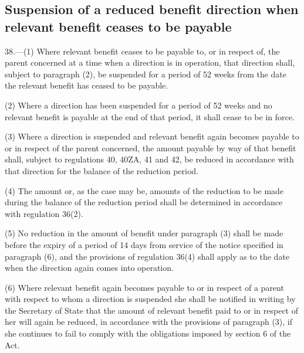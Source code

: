 \documentclass[a4paper,12pt]{article}
\begin{document}

\subsection[38. Suspension of a reduced benefit direction when relevant benefit ceases to be payable]{Suspension of a reduced benefit direction when relevant benefit ceases to be payable}

38.—(1) Where relevant benefit ceases to be payable to, or in respect of, the parent concerned at a time when a direction is in operation, that direction shall, subject to paragraph (2), be suspended for a period of 52 weeks from the date the relevant benefit has ceased to be payable.

(2) Where a direction has been suspended for a period of 52 weeks and no relevant benefit is payable at the end of that period, it shall cease to be in force.

(3) Where a direction is suspended and relevant benefit again becomes payable to or in respect of the parent concerned, the amount payable by way of that benefit shall, subject to regulations 40, 
40ZA,  %
41 and 42, be reduced in accordance with that direction for the balance of the reduction period.

(4) The amount or, as the case may be, amounts of the reduction to be made during the balance of the reduction period shall be determined in accordance with regulation 36(2).

(5) No reduction in the amount of benefit under paragraph (3) shall be made before the expiry of a period of 14 days from service of the notice specified in paragraph (6), and the provisions of regulation 36(4) shall apply as to the date when the direction again comes into operation.

(6) Where relevant benefit again becomes payable to or in respect of a parent with respect to whom a direction is suspended she shall be notified in writing by 
the Secretary of State  %
that the amount of relevant benefit paid to or in respect of her will again be reduced, in accordance with the provisions of paragraph (3), if she continues to fail to comply with the obligations imposed by section 6 of the Act.
\end{document}
